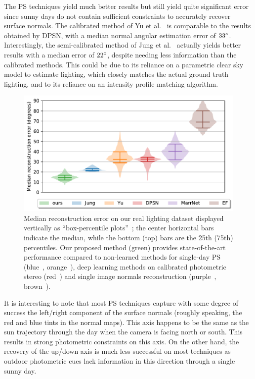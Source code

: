 The PS techniques yield much better results but still yield quite significant error since sunny days do not contain sufficient constraints to accurately recover surface normals. The calibrated method of Yu et al.~\cite{yu-iccp-13} is comparable to the results obtained by DPSN, with a median normal angular estimation error of $33^{\circ}$. Interestingly, the semi-calibrated method of Jung et al.~\cite{jung-cvpr-15} actually yields better results with a median error of $22^{\circ}$, despite needing less information than the calibrated methods. This could be due to its reliance on a parametric clear sky model to estimate lighting, which closely matches the actual ground truth lighting, and to its reliance on an intensity profile matching algorithm.


\begin{figure}[t]
\centering
\includegraphics[width=0.75\linewidth]{figures/results/real_lighting_performance.pdf}
\caption{Median reconstruction error on our real lighting dataset displayed vertically as “box-percentile plots”~\cite{esty-jss-03}; the center horizontal bars indicate the median, while the bottom (top) bars are the 25th (75th) percentiles. Our proposed method (green) provides state-of-the-art performance compared to non-learned methods for single-day PS (blue~\cite{jung-cvpr-15}, orange~\cite{yu-iccp-13}), deep learning methods on calibrated photometric stereo (red~\cite{santo-iccv-17}) and single image normals reconstruction (purple~\cite{wu-nips-17}, brown~\cite{eigen-iccv-15}).}
\label{fig:results-quantitative}
\end{figure}

It is interesting to note that most PS techniques capture with some degree of success the left/right component of the surface normals (roughly speaking, the red and blue tints in the normal maps). This axis happens to be the same as the sun trajectory through the day when the camera is facing north or south. This results in strong photometric constraints on this axis. On the other hand, the recovery of the up/down axis is much less successful on most techniques as outdoor photometric cues lack information in this direction through a single sunny day.


